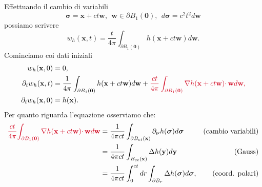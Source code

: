 \documentclass[10pt,a4paper,twoside,openright]{book}
\newcommand{\x}{\mathbf{x}}
\newcommand{\y}{\mathbf{y}}
\begin{document}
\begin{dimostrazione}
	Effettuando il cambio di variabili
	\begin{equation*}
		\bm{\sigma } =\x +ct\mathbf{w} ,\ \ \mathbf{w} \in \partial B_{1}(\mathbf{0}) ,\ \ d\bm{\sigma } =c^{2} t^{2} d\mathbf{w}
	\end{equation*}
	possiamo scrivere
	\begin{equation*}
		w_{h}(\x ,t) =\frac{t}{4\pi }\int _{\partial B_{1}(\mathbf{0})} h(\x +ct\mathbf{w}) d\mathbf{w} .
	\end{equation*}
	Cominciamo coi dati iniziali
	\begin{align*}
		w_{h}(\x ,0)               & =0,                                                                                                                                                                                                                                              \\
		\partial _{t} w_{h}(\x ,t) & =\frac{1}{4\pi }\int _{\partial B_{1}(\mathbf{0})} h(\x +ct\mathbf{w}) d\mathbf{w} +\textcolor[rgb]{0.82,0.01,0.11}{\frac{ct}{4\pi }\int _{\partial B_{1}(\mathbf{0})}\nabla h(\x +ct\mathbf{w})\cdotp \mathbf{w} d\mathbf{w} ,} \\
		\partial _{t} w_{h}(\x ,0) & =h(\x) .                                                                                                                                                                                                                                 
	\end{align*}
	Per quanto riguarda l'equazione osserviamo che:
	\begin{align*}
		\textcolor[rgb]{0.82,0.01,0.11}{\frac{ct}{4\pi }}\textcolor[rgb]{0.82,0.01,0.11}{\int _{\partial B_{1}(\mathbf{0})}\nabla h(\x+ct\mathbf{w})\cdotp \mathbf{w}d\mathbf{w}} & =\frac{1}{4\pi ct}\int _{\partial B_{ct}(\x)} \partial _{\bm{\nu }} h(\bm{\sigma })d\bm{\sigma } & \text{(cambio variabili)}    \\
		                                                                                                                                                                                  & =\frac{1}{4\pi ct}\int _{B_{ct}(\x)} \Delta h(\y) d\y                  & \text{(Gauss)}         \\
		                                                                                                                                                                                  & =\frac{1}{4\pi ct}\int _{0}^{ct} dr\int _{\partial B_{r}} \Delta h(\bm{\sigma }) d\bm{\sigma } ,               & \text{(coord. polari)} 

\end{align*}
\end{dimostrazione}
\end{document}
